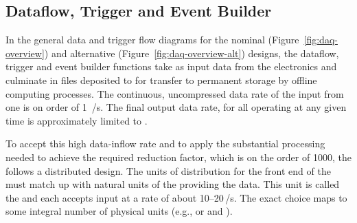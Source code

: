 
\subsection{Dataflow, Trigger and Event Builder}
\label{sec:fd-daq-hlt}


In the general data and trigger flow diagrams for the nominal
(Figure~\ref{fig:daq-overview}) and alternative
(Figure~\ref{fig:daq-overview-alt}) designs, the dataflow, trigger and
event builder functions take as input data from the 
electronics and culminate in files deposited to  for
transfer to permanent storage by offline computing processes.  
The continuous, uncompressed data rate of the input from one
 is on order of \SI{1}{\TB/\s}. 
The final output data rate, for all  operating at
any given time is approximately limited to \offsitegbyteps. 

To accept this high data-inflow rate and to apply the substantial
processing needed to achieve the required reduction factor, which is on the 
order of \num{1000}, the  follows a distributed design.
The units of distribution for the front end of the  must match up
with natural units of the  providing the data. 
This unit is called the  and each accepts input at a
rate of about \numrange{10}{20}\,\si{\GB/\s}. 
The exact choice maps to some integral number of physical
 units (e.g.,   or 
 and ).

